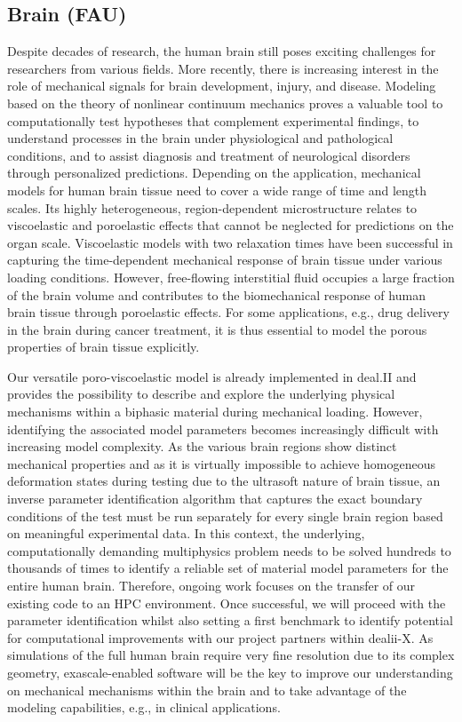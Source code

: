 \documentclass[a4paper,12pt]{article}
\begin{document}
\subsection{Brain (FAU)}
Despite decades of research, the human brain still poses exciting challenges for researchers from various fields.
More recently, there is increasing interest in the role of mechanical signals for brain development, injury, and disease.
Modeling based on the theory of nonlinear continuum mechanics proves a valuable tool to computationally test hypotheses that complement experimental findings, to understand processes in the brain under physiological and pathological conditions, and to assist diagnosis and treatment of neurological disorders through personalized predictions.
Depending on the application, mechanical models for human brain tissue need to cover a wide range of time and length scales.
Its highly heterogeneous, region-dependent microstructure relates to viscoelastic and poroelastic effects that cannot be neglected for predictions on the organ scale.
Viscoelastic models with two relaxation times have been successful in capturing the time-dependent mechanical response of brain tissue under various loading conditions.
However, free-flowing interstitial fluid occupies a large fraction of the brain volume and contributes to the biomechanical response of human brain tissue through poroelastic effects.
For some applications, e.g., drug delivery in the brain during cancer treatment, it is thus essential to model the porous properties of brain tissue explicitly.

Our versatile poro-viscoelastic model is already implemented in deal.II and provides the possibility to describe and explore the underlying physical mechanisms within a biphasic material during mechanical loading.
However, identifying the associated model parameters becomes increasingly difficult with increasing model complexity.
As the various brain regions show distinct mechanical properties and as it is virtually impossible to achieve homogeneous deformation states during testing due to the ultrasoft nature of brain tissue, an inverse parameter identification algorithm that captures the exact boundary conditions of the test must be run separately for every single brain region based on meaningful experimental data.
In this context, the underlying, computationally demanding multiphysics problem needs to be solved hundreds to thousands of times to identify a reliable set of material model parameters for the entire human brain.
Therefore, ongoing work focuses on the transfer of our existing code to an HPC environment.
Once successful, we will proceed with the parameter identification whilst also setting a first benchmark to identify potential for computational improvements with our project partners within dealii-X.
As simulations of the full human brain require very fine resolution due to its complex geometry, exascale-enabled software will be the key to improve our understanding on mechanical mechanisms within the brain and to take advantage of the modeling capabilities, e.g., in clinical applications.
\end{document}

